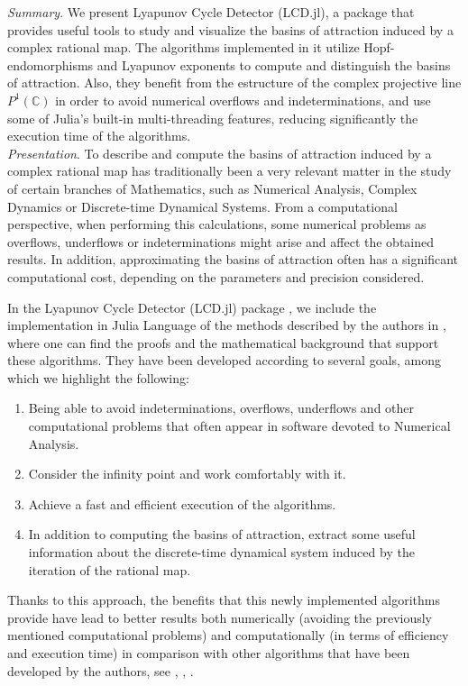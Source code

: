 \documentclass{juliacon}
\begin{document}


\maketitle

\textit{Summary}. We present Lyapunov Cycle Detector (LCD.jl), a package that provides useful tools to study and visualize the basins of attraction induced by a complex rational map. The algorithms implemented in it utilize Hopf-endomorphisms and Lyapunov exponents to compute and distinguish the basins of attraction. Also, they benefit from the estructure of the complex projective line $P^1(\mathbb{C})$ in order to avoid numerical overflows and indeterminations, and use some of Julia's built-in multi-threading features, reducing significantly the execution time of the algorithms.\\

\textit{Presentation}. To describe and compute the basins of attraction induced by a complex rational map has traditionally been a very relevant matter in the study of certain branches of Mathematics, such as Numerical Analysis, Complex Dynamics or Discrete-time Dynamical Systems. From a computational perspective, when performing this calculations, some numerical problems as overflows, underflows or indeterminations might arise and affect the obtained results. In addition, approximating the basins of attraction often has a significant computational cost, depending on the parameters and precision considered.

In the Lyapunov Cycle Detector (LCD.jl) package \cite{alvarez}, we include the implementation in Julia Language \cite{bezanson} of the methods described by the authors in \cite{preprint}, where one can find the proofs and the mathematical background that support these algorithms. They have been developed according to several goals, among which we highlight the following:
\begin{enumerate}
    \item Being able to avoid indeterminations, overflows, underflows and other computational problems that often appear in software devoted to Numerical Analysis.
    \item Consider the infinity point and work comfortably with it.
    \item Achieve a fast and efficient execution of the algorithms.
    \item In addition to computing the basins of attraction, extract some useful information about the discrete-time dynamical system induced by the iteration of the rational map.
\end{enumerate}
Thanks to this approach, the benefits that this newly implemented algorithms provide have lead to better results both numerically (avoiding the previously mentioned computational problems) and computationally (in terms of efficiency and execution time) in comparison with other algorithms that have been developed by the authors, see \cite{julia}, \cite{lj}, \cite{sage}.\\
\end{document}
